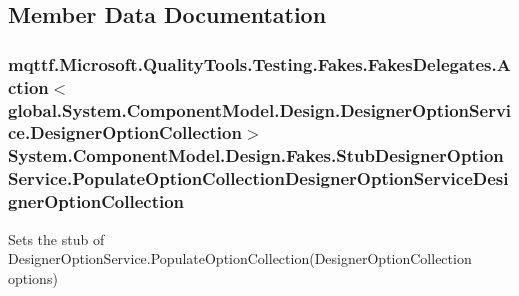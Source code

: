 \subsection{Member Data Documentation}
\hypertarget{class_system_1_1_component_model_1_1_design_1_1_fakes_1_1_stub_designer_option_service_a8617ce26de67fb990632f4f837f65409}{
\subsubsection[{Populate\-Option\-Collection\-Designer\-Option\-Service\-Designer\-Option\-Collection}]{\setlength{\rightskip}{0pt plus 5cm}mqttf.\-Microsoft.\-Quality\-Tools.\-Testing.\-Fakes.\-Fakes\-Delegates.\-Action$<$global.\-System.\-Component\-Model.\-Design.\-Designer\-Option\-Service.\-Designer\-Option\-Collection$>$ System.\-Component\-Model.\-Design.\-Fakes.\-Stub\-Designer\-Option\-Service.\-Populate\-Option\-Collection\-Designer\-Option\-Service\-Designer\-Option\-Collection}}\label{class_system_1_1_component_model_1_1_design_1_1_fakes_1_1_stub_designer_option_service_a8617ce26de67fb990632f4f837f65409}


Sets the stub of Designer\-Option\-Service.\-Populate\-Option\-Collection(\-Designer\-Option\-Collection options)

